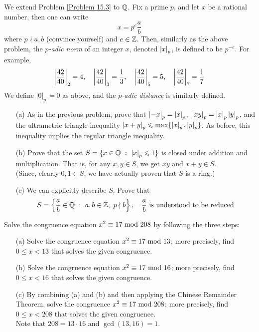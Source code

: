 \begin{problem}\label{Problem 15.4}
We extend Problem \ref{Problem 15.3} to $\mathbb Q$. Fix a prime $p$, and let $x$ be a rational number, then one can write
\[x = p^e\frac{a}{b}\]
where $p\nmid a,b$ (convince yourself) and $e \in \mathbb Z$. Then, similarly as the above problem, the \emph{$p$-adic norm} of an integer $x$, denoted $\left\lvert x\right\rvert_p$, is defined to be $p^{-e}$. For example,
\[\left\lvert\frac{42}{40}\right\rvert_2 = 4,\quad \left\lvert\frac{42}{40}\right\rvert_{3} = \frac{1}{3},\quad \left\lvert\frac{42}{40}\right\rvert_{5} = 5,\quad \left\lvert\frac{42}{40}\right\rvert_{7} = \frac{1}{7}\]
We define $|0|_p \coloneqq 0$ as above, and the \emph{$p$-adic distance} is similarly defined.
\begin{itemize}
\item[(a)] As in the previous problem, prove that $\abs{-x}_p = \abs{x}_p,\ \abs{xy}_p = \abs{x}_p\abs{y}_p$, and the ultrametric triangle inequality $\left\lvert x+y\right\rvert_p \leqslant \max\{\left\lvert x\right\rvert_p,\left\lvert y\right\rvert_p\}$. As before, this inequality implies the regular triangle inequality.
\item[(b)] Prove that the set $S = \{x \in \mathbb Q\ :\ \left\lvert x\right\rvert_p \leqslant 1\}$ is closed under addition and multiplication. That is, for any $x,y \in S$, we get $xy$ and $x + y \in S$.\\[0.5em]
(Since, clearly $0,1 \in S$, we have actually proven that $S$ is a ring.)
\item[(c)] We can explicitly describe $S$. Prove that
\[S = \left\{\frac{a}{b}\in \mathbb Q\ :\ a,b \in \mathbb Z,\ p\nmid b\right\},\quad \frac{a}{b} \text{ is understood to be reduced}\]
\end{itemize}
\end{problem}

\vspace*{0.2in}

\begin{problem}\label{Problem 15.5}
Solve the congruence equation $x^2 \equiv 17 \text{ mod }{208}$ by following the three steps:
\begin{itemize}
\item[(a)] Solve the congruence equation $x^2 \equiv 17 \text{ mod }{13}$; more precisely, find $0 \leq x < 13$ that solves the given congruence.
\item[(b)] Solve the congruence equation $x^2 \equiv 17 \text{ mod }{16}$; more precisely, find $0 \leq x < 16$ that solves the given congruence.
\item[(c)] By combining (a) and (b) and then applying the Chinese Remainder Theorem, solve the congruence $x^2 \equiv 17\text{ mod }{208}$; more precisely, find $0 \leq x < 208$ that solves the given congruence.\\[0.2em]
{\footnotesize Note that $208 = 13\cdot 16$ and $\gcd(13,16) = 1$.}\\[-2em]
\end{itemize}
\end{problem}